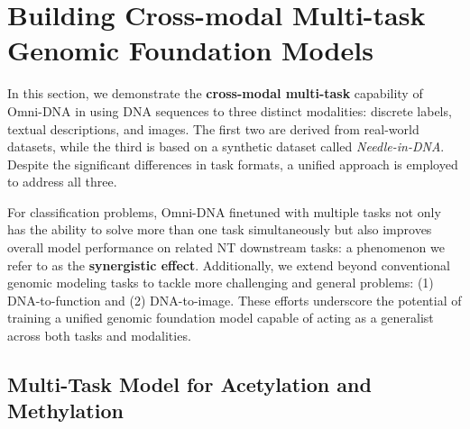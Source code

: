 \section{Building Cross-modal Multi-task Genomic Foundation Models}

In this section, we demonstrate the \textbf{cross-modal multi-task} capability of Omni-DNA in using DNA sequences to three distinct modalities: discrete labels, textual descriptions, and images. The first two are derived from real-world datasets, while the third is based on a synthetic dataset called \textit{Needle-in-DNA}. Despite the significant differences in task formats, a unified approach is employed to address all three.

For classification problems, Omni-DNA finetuned with multiple tasks not only has the ability to solve more than one task simultaneously but also improves overall model performance on related NT downstream tasks: a phenomenon we refer to as the \textbf{synergistic effect}. Additionally, we extend beyond conventional genomic modeling tasks to tackle more challenging and general problems: (1) DNA-to-function and (2) DNA-to-image. These efforts underscore the potential of training a unified genomic foundation model capable of acting as a generalist across both tasks and modalities.

\subsection{Multi-Task Model for Acetylation and Methylation}


